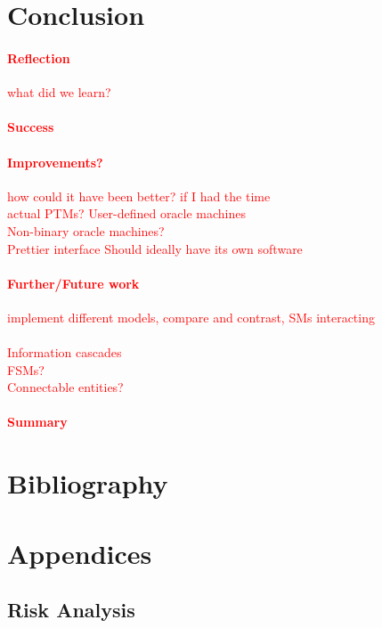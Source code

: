 \documentclass[12pt,a4,xcolor=table]{article}
\begin{document}
	\section{Conclusion}
	\textcolor{red}{
		\paragraph{Reflection}
		what did we learn?
		\paragraph{Success}
		\paragraph{Improvements?}
		how could it have been better? if I had the time\\
		actual PTMs?
		User-defined oracle machines\\
		Non-binary oracle machines?\\
		Prettier interface
		Should ideally have its own software
		\paragraph{Further/Future work}
		implement different models, compare and contrast, SMs interacting\\\\
		Information cascades\cite{Luczak-Rosch2015}\\
		FSMs?\cite{Robertson2013}\\
		Connectable entities?\cite{Silvio2010}
		\paragraph{Summary}
	}
	
	
	\section{Bibliography}
	
	
	\appendix
	\section{Appendices}
	\subsection{Risk Analysis}
	\label{sec:app}
	
\end{document}
